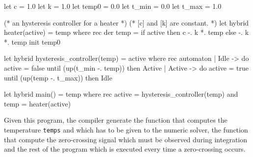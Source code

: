 \documentclass[11pt,titlepage,twoside]{report}
\newcommand{\Marc}[1]{{\bf Marc.} ({#1})}
\begin{document}






\begin{runverbatim}
let c = 1.0
let k = 1.0
let temp0 = 0.0
let t_min = 0.0
let t_max = 1.0
\end{runverbatim}
\begin{runverbatim}[continue]
(* an hysteresis controller for a heater *)
(* [c] and [k] are constant. *)
let hybrid heater(active) = temp where
  rec der temp = if active then c -. k *. temp else -. k *. temp init temp0

let hybrid hysteresis_controller(temp) = active where
  rec automaton
      | Idle -> do active = false until (up(t_min -. temp)) then Active
      | Active -> do active = true until (up(temp -. t_max)) then Idle
 
let hybrid main() = temp where
  rec active = hysteresis_controller(temp)
  and temp = heater(active)
\end{runverbatim}

Given this program, the compiler generate the function that computes
the temperature \verb-temps- and which has to be given to the numeric solver,
the function that compute the zero-crossing signal which must be observed
during integration and the rest of the program which is executed every time
a zero-crossing occurs.
\end{document}

